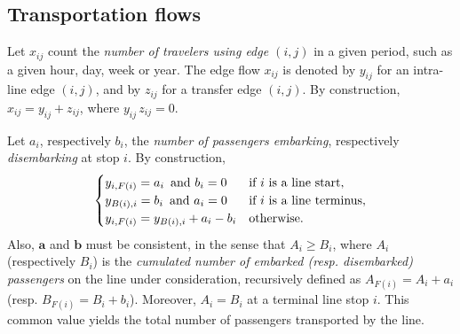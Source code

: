 \documentclass{bmcart}
\begin{document}
\vspace*{0.1cm}

\subsection{Transportation flows}
\label{Transportation flows}
Let  $x_{ij}$ count the \emph{number of travelers using edge $(i,j)$} in a given period, such as a given hour, day, week or  year.  The edge flow $x_{ij}$ is denoted by $y_{ij}$ for an intra-line edge $(i,j)$, and 
by $z_{ij}$ for a transfer edge $(i,j)$. By construction, $x_{ij}=y_{ij}+z_{ij}$, where $y_{ij}\,  z_{ij}=0$. 

\vspace*{0.1cm}


Let $a_i$, respectively $b_i$, the \emph{number of passengers embarking}, respectively \emph{disembarking} at stop $i$. By construction, 
\begin{equation}
\label{bilan1ligne}
\begin{cases}
 y_{i,F(i)}=a_i \text{\,  and } b_i=0   & \text{if $i$ is a line start}, \\
y_{B(i),i}=b_i \text{\,  and } a_i=0   & \text{if $i$ is a line terminus}, \\
 y_{i,F(i)}=y_{B(i),i}+a_i-b_i     & \text{otherwise}.
\end{cases}
\end{equation}
Also, $\mathbf{a}$ and $\mathbf{b}$ must be consistent, in the sense that $A_i\ge B_i$, where $A_i$ (respectively $B_i$) is the \emph{cumulated number of embarked 
(resp. disembarked) passengers} on the line under consideration, recursively defined as $A_{F(i)}=A_i+a_i$ (resp. $B_{F(i)}=B_i+b_i$). Moreover,  $A_i=B_i$ at a terminal line stop $i$. This common value yields  the total number of passengers transported by the line. 



\vspace*{0.1cm}
\end{document}
